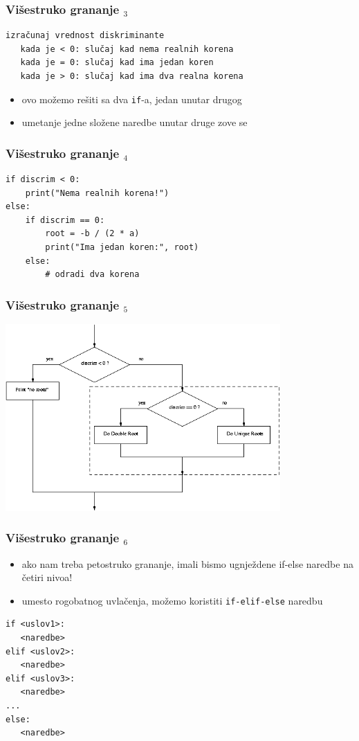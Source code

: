 \documentclass[utf8,compress,aspectratio=169]{beamer}
\begin{document}
\begin{frame}[fragile]
  \frametitle{Višestruko grananje $_3$}
\begin{verbatim}
izračunaj vrednost diskriminante
   kada je < 0: slučaj kad nema realnih korena
   kada je = 0: slučaj kad ima jedan koren
   kada je > 0: slučaj kad ima dva realna korena
\end{verbatim}
  \begin{itemize}
    \item ovo možemo rešiti sa dva \texttt{if}-a, jedan unutar drugog
    \item umetanje jedne složene naredbe unutar druge zove se 
  \end{itemize}
\end{frame}

\begin{frame}[fragile]
  \frametitle{Višestruko grananje $_4$}
\begin{verbatim}
if discrim < 0:
    print("Nema realnih korena!")
else:
    if discrim == 0:
        root = -b / (2 * a)
        print("Ima jedan koren:", root)
    else:
        # odradi dva korena
\end{verbatim}
\end{frame}

\begin{frame}[fragile]
  \frametitle{Višestruko grananje $_5$}
\begin{center}
  \includegraphics[width=10.5cm]{pic16}
\end{center}
\end{frame}

\begin{frame}[fragile]
  \frametitle{Višestruko grananje $_6$}
  \begin{itemize}
    \item ako nam treba petostruko grananje, imali bismo ugnježdene if-else naredbe na četiri nivoa!
    \item umesto rogobatnog uvlačenja, možemo koristiti \texttt{if-elif-else} naredbu
  \end{itemize}
\begin{verbatim}
if <uslov1>:
   <naredbe>
elif <uslov2>:
   <naredbe>
elif <uslov3>:
   <naredbe>
...
else:
   <naredbe>
\end{verbatim}
\end{frame}
\end{document}
